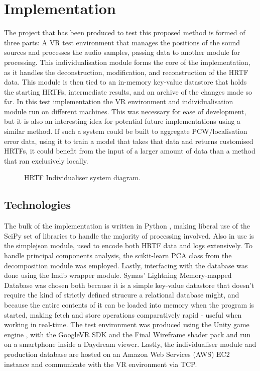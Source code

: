 \section{Implementation}
The project that has been produced to test this proposed method is formed of three parts: A VR test environment that manages the positions of the sound sources and processes the audio samples, passing data to another module for processing. This individualisation module forms the core of the implementation, as it handles the deconstruction, modification, and reconstruction of the HRTF data. This module is then tied to an in-memory key-value datastore that holds the starting HRTFs, intermediate results, and an archive of the changes made so far. In this test implementation the VR environment and individualisation module run on different machines. This was necessary for ease of development, but it is also an interesting idea for potential future implementations using a similar method. If such a system could be built to aggregate PCW/localisation error data, using it to train a model that takes that data and returns customised HRTFs, it could benefit from the input of a larger amount of data than a method that ran exclusively locally. 

\begin{figure}
	\caption{HRTF Individualiser system diagram. }
\end{figure}

\subsection{Technologies}
The bulk of the implementation is written in Python \citep{GuidovanRossum}, making liberal use of the SciPy\citep{Jones} set of libraries to handle the majority of processing involved. Also in use is the simplejson\citep{Ippolito} module, used to encode both HRTF data and logs extensively. To handle principal components analysis, the scikit-learn\citep{scikit-learn} PCA class from the decomposition module was employed. Lastly, interfacing with the database was done using the lmdb wrapper module\citep{lmdbpython}. Symas' Lightning Memory-mapped Database \citep{openldap} was chosen both because it is a simple key-value datastore that doesn't require the kind of strictly defined strucure a relational database might, and because the entire contents of it can be loaded into memory when the program is started, making fetch and store operations comparatively rapid - useful when working in real-time. The test environment was produced using the Unity game engine \citep{engine9unity}, with the GoogleVR SDK \citep{DevelopersGoogle2016} and the Final Wireframe \citep{finalwireframe} shader pack and run on a smartphone inside a Daydream\citep{Google2016} viewer. Lastly, the individualiser module and production database are hosted on an Amazon Web Services (AWS) EC2 instance and communicate with the VR environment via TCP.

